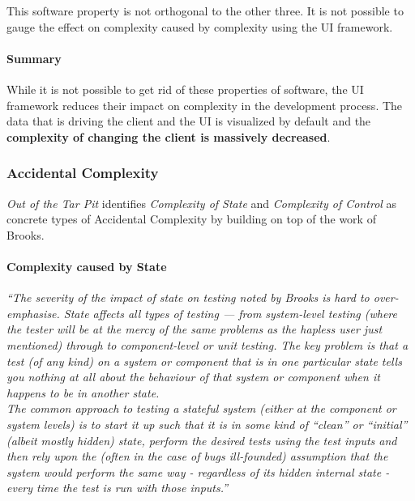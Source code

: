 This software property is not orthogonal to the other three. It is not possible to gauge the effect on complexity caused by complexity using the UI framework.

\paragraph{Summary}
While it is not possible to get rid of these properties of software, the UI framework reduces their impact on complexity in the development process. The data that is driving the client and the UI is visualized by default and the \textbf{complexity of changing the client is massively decreased}.

\subsubsection{Accidental Complexity}
\textit{Out of the Tar Pit} identifies \textit{Complexity of State} and \textit{Complexity of Control} as concrete types of Accidental Complexity by building on top of the work of Brooks.

\paragraph{Complexity caused by State}
\textit{``The severity of the impact of state on testing noted by Brooks is hard to over-emphasise. State affects all types of testing — from system-level testing (where the tester will be at the mercy of the same problems as the hapless user just mentioned) through to component-level or unit testing. The key problem is that a test (of any kind) on a system or component that is in one particular state tells you nothing at all about the behaviour of that system or component when it happens to be in another state. \\ The common approach to testing a stateful system (either at the component or system levels) is to start it up such that it is in some kind of “clean” or “initial” (albeit mostly hidden) state, perform the desired tests using the test inputs and then rely upon the (often in the case of bugs ill-founded) assumption that the system would perform the same way - regardless of its hidden internal state - every time the test is run with those inputs.''} \citep[p.~6]{outoftarpit}

